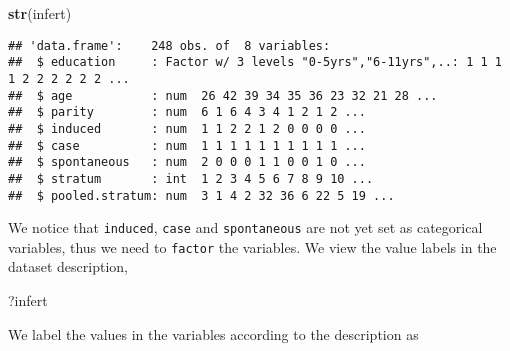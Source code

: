 \documentclass[]{book}
\newenvironment{Shaded}{\begin{snugshade}}{\end{snugshade}}
\newcommand{\KeywordTok}[1]{\textcolor[rgb]{0.13,0.29,0.53}{\textbf{{#1}}}}
\newcommand{\DataTypeTok}[1]{\textcolor[rgb]{0.13,0.29,0.53}{{#1}}}
\newcommand{\DecValTok}[1]{\textcolor[rgb]{0.00,0.00,0.81}{{#1}}}
\newcommand{\StringTok}[1]{\textcolor[rgb]{0.31,0.60,0.02}{{#1}}}
\newcommand{\NormalTok}[1]{{#1}}
\theoremstyle{definition}
\theoremstyle{definition}
\theoremstyle{remark}
\begin{document}
\begin{Shaded}
\begin{Highlighting}[]
\KeywordTok{str}\NormalTok{(infert)}
\end{Highlighting}
\end{Shaded}

\begin{verbatim}
## 'data.frame':    248 obs. of  8 variables:
##  $ education     : Factor w/ 3 levels "0-5yrs","6-11yrs",..: 1 1 1 1 2 2 2 2 2 2 ...
##  $ age           : num  26 42 39 34 35 36 23 32 21 28 ...
##  $ parity        : num  6 1 6 4 3 4 1 2 1 2 ...
##  $ induced       : num  1 1 2 2 1 2 0 0 0 0 ...
##  $ case          : num  1 1 1 1 1 1 1 1 1 1 ...
##  $ spontaneous   : num  2 0 0 0 1 1 0 0 1 0 ...
##  $ stratum       : int  1 2 3 4 5 6 7 8 9 10 ...
##  $ pooled.stratum: num  3 1 4 2 32 36 6 22 5 19 ...
\end{verbatim}

We notice that \texttt{induced}, \texttt{case} and \texttt{spontaneous}
are not yet set as categorical variables, thus we need to
\texttt{factor} the variables. We view the value labels in the dataset
description,

\begin{Shaded}
\begin{Highlighting}[]
\NormalTok{?infert}
\end{Highlighting}
\end{Shaded}

We label the values in the variables according to the description as

\begin{Shaded}
\end{Shaded}
\end{document}
